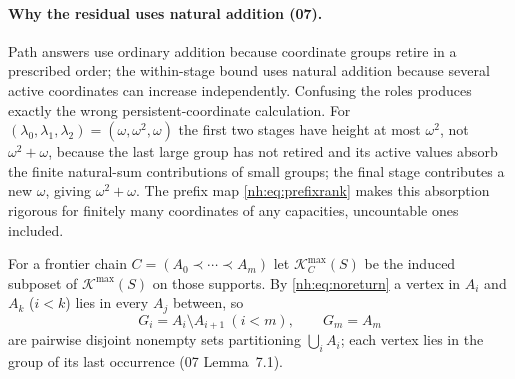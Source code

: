 \documentclass[11pt,a4paper]{article}
\theoremstyle{definition}
\theoremstyle{remark}
\newcommand{\K}{\mathcal K}
\newcommand{\Kmax}{\K^{\max}}
\begin{document}
\paragraph{Why the residual uses natural addition (07).} Path answers use
ordinary addition because coordinate groups retire in a prescribed order; the
within-stage bound uses natural addition because several active coordinates can
increase independently. Confusing the roles produces exactly the wrong
persistent-coordinate calculation. For $(\lambda_0,\lambda_1,\lambda_2)=
(\omega,\omega^2,\omega)$ the first two stages have height at most $\omega^2$,
not $\omega^2+\omega$, because the last large group has not retired and its
active values absorb the finite natural-sum contributions of small groups; the
final stage contributes a new $\omega$, giving $\omega^2+\omega$. The prefix map
\eqref{nh:eq:prefixrank} makes this absorption rigorous for finitely many
coordinates of any capacities, uncountable ones included.

For a frontier chain $C=(A_0\prec\cdots\prec A_m)$ let $\Kmax_C(S)$ be the
induced subposet of $\Kmax(S)$ on those supports. By \eqref{nh:eq:noreturn} a
vertex in $A_i$ and $A_k$ ($i<k$) lies in every $A_j$ between, so
\begin{equation}\label{nh:eq:retirementgroups}
 G_i=A_i\setminus A_{i+1}\ (i<m),\qquad G_m=A_m
\end{equation}
are pairwise disjoint nonempty sets partitioning $\bigcup_iA_i$; each vertex
lies in the group of its last occurrence (07 Lemma~7.1).
\end{document}
